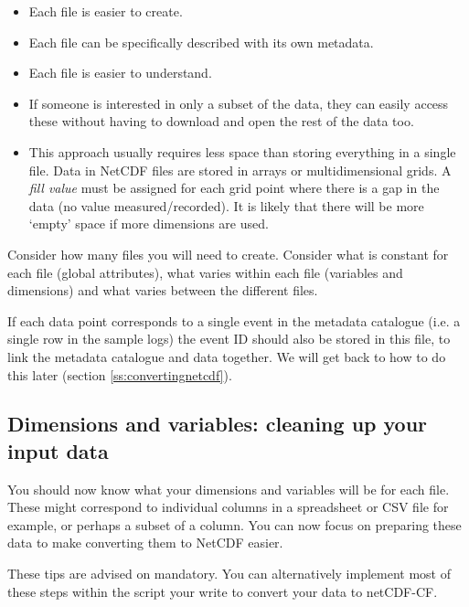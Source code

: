 \documentclass[a4paper,english, 11pt]{article}
\begin{document}
\begin{itemize}
\item Each file is easier to create.
\item Each file can be specifically described with its own metadata.
\item Each file is easier to understand.
\item If someone is interested in only a subset of the data, they can easily access these without having to download and open the rest of the data too.
\item This approach usually requires less space than storing everything in a single file. Data in NetCDF files are stored in arrays or multidimensional grids. A \textit{fill value} must be assigned for each grid point where there is a gap in the data (no value measured/recorded). It is likely that there will be more `empty' space if more dimensions are used. 
\end{itemize}   

Consider how many files you will need to create. Consider what is constant for each file (global attributes), what varies within each file (variables and dimensions) and what varies between the different files.

If each data point corresponds to a single event in the metadata catalogue (i.e. a single row in the sample logs) the event ID should also be stored in this file, to link the metadata catalogue and data together. We will get back to how to do this later (section \ref{ss:convertingnetcdf}).

\subsection{Dimensions and variables: cleaning up your input data}
\label{ss:dimensionsvariables}

You should now know what your dimensions and variables will be for each file. These might correspond to individual columns in a spreadsheet or CSV file for example, or perhaps a subset of a column. You can now focus on preparing these data to make converting them to NetCDF easier.

These tips are advised on mandatory. You can alternatively implement most of these steps within the script your write to convert your data to netCDF-CF. 
\end{document}
